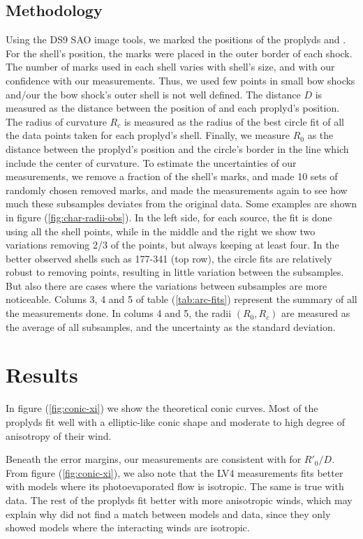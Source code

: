 \subsection{Methodology}
\label{sec:methodology}
Using the DS9 SAO image tools, we marked the positions of the proplyds and \thC{}. For the shell's position, the marks were placed in the outer border of each shock. 
The number of marks used in each shell varies with shell's size, and with our confidence with our measurements.
Thus, we used few points in small bow shocks and/our the bow shock's outer shell is not well defined. The distance $D$ is measured as the distance between the position of \thC{} 
and each proplyd's position. The radius of curvature $R_c$ is measured as the radius of the 
best circle fit of all the data points taken for each proplyd's shell. Finally, we measure $R_0$ as the distance between the proplyd's position and the circle's border in the line which 
include the center of curvature.
To estimate the uncertainties of our measurements, we remove a fraction of the shell's marks, and made 10 sets of randomly chosen removed marks, and made the measurements again to 
see how much these subsamples deviates from the original data. Some examples are shown  in figure (\ref{fig:char-radii-obs}).  In the left side, for each source, 
the fit is done using all the shell points, while in the middle and the right we show two variations removing 2/3 of the points, but always keeping at least four. 
In the better observed shells such as 177-341 (top row), the circle
fits are relatively robust to removing points, resulting in little variation between the subsamples. 
But also there are cases where the variations between subsamples are more noticeable. Colums 3, 4 and 5 of table (\ref{tab:arc-fits}) represent the summary of all the measurements done. In colums 4 and 5, 
the radii $(R_0,R_c)$ are measured as the average of all subsamples, and the uncertainty as the standard deviation.

\section{Results}
\label{sec:results}
In figure (\ref{fig:conic-xi}) we show the theoretical conic curves. Most of the proplyds fit well 
with a elliptic-like conic shape and moderate to high degree of anisotropy of their wind.

Beneath the error margins, our measurements are consistent with \citet{Robberto:2005} for $R'_0/D$. From figure (\ref{fig:conic-xi}), we also
note that the LV4 measurements fits better with models where its photoevaporated flow is isotropic. The same is true with \citet{Robberto:2005} data.
The rest of the proplyds fit better with more anisotropic winds, which may explain why \citet{Robberto:2005} did not find a match between models
and data, since they only showed models where the interacting winds are isotropic.

